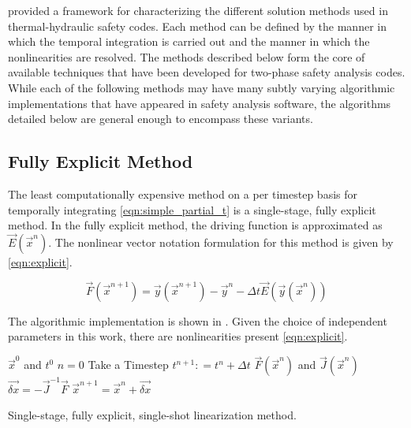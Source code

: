  provided a framework for characterizing the different solution methods used in thermal-hydraulic safety codes. 
Each method can be defined by the manner in which the temporal integration is carried out and the manner in which the nonlinearities are resolved.
The methods described below form the core of available techniques that have been developed for two-phase safety analysis codes. 
While each of the following methods may have many subtly varying algorithmic implementations that have appeared in safety analysis software, the algorithms detailed below are general enough to encompass these variants.

\subsection{Fully Explicit Method}
\label{subsect:numerics_explicit}
The least computationally expensive method on a per timestep basis for temporally integrating \eqref{eqn:simple_partial_t} is a single-stage, fully explicit method.
In the fully explicit method, the driving function is approximated as $\vec{E}(\vec{x}^n)$.
The nonlinear vector notation formulation for this method is given by \eqref{eqn:explicit}.

\begin{equation}
\label{eqn:explicit}
\vec{F}(\vec{x}^{n+1}) = \vec{y}(\vec{x}^{n+1}) - \vec{y}^{n} - \Delta t \vec{E}(\vec{y}(\vec{x}^{n}))
\end{equation}

The algorithmic implementation is shown in .
Given the choice of independent parameters in this work, there are nonlinearities present \eqref{eqn:explicit}.

\begin{algo}[ht!]
\setlength{\baselineskip}{0.625\baselineskip}
\begin{algorithmic}[1]
\Require $\vec{x}^{0}$ and $t^{0}$
\Set $n = 0$
\Loop \; Take a Timestep
    \State $t^{n+1} : = t^{n} + \Delta t$
    \Calculate $\vec{F}(\vec{x}^n)$ and $\vec{J}(\vec{x}^n)$
    \Calculate $\vec{\delta x} = -\vec{J}^{-1}\vec{F}$
    \Calculate $\vec{x}^{n+1} = \vec{x}^{n} + \vec{\delta x}$ 
\end{algorithmic}
\caption{Single-stage, fully explicit, single-shot linearization method.}
\label{algo:explicit}
\end{algo}

